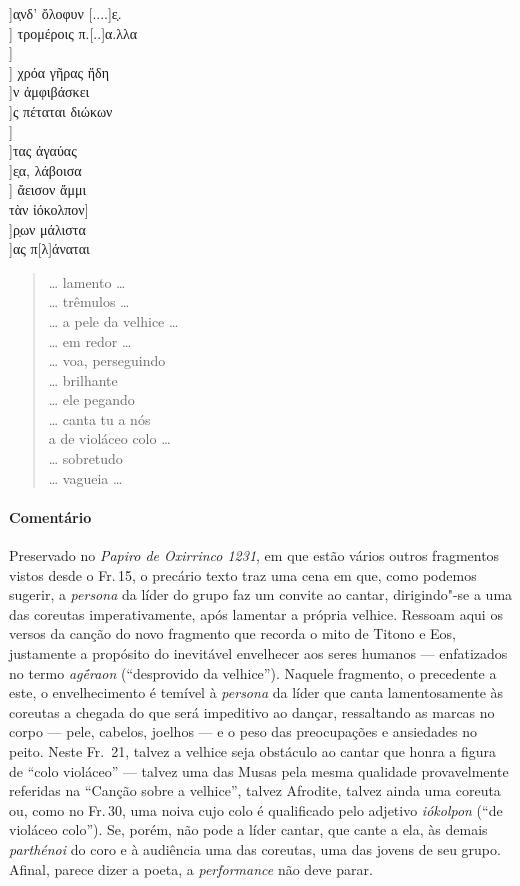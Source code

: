 {\begin{gkverse}
]α̣νδ’ ὄλοφυν [....]ε̣.\\
] τρομέροις π.[..]α.λλα\\
]\\
  ] χρόα γῆρας ἤδη\\
   ]ν ἀμφιβάσκει\\
     ]ς πέταται διώκων\\
     ]\\
     ]τας ἀγαύας\\
   ]ε̣α, λάβοισα\\
   ] ἄεισον ἄμμι\\
τὰν ἰόκολπον\qquad         ]\\
        ]ρ̣ων μάλιστα\\
         ]ας π[λ]άναται
\end{gkverse}


\begin{verse}
\ldots{} lamento \ldots{}\\
\ldots{} trêmulos \ldots{}\\
\ldots{} a pele da velhice \ldots{}\\
\ldots{} em redor \ldots{}\\
\ldots{} voa, perseguindo\\
\ldots{} brilhante\\
\ldots{} ele pegando\\
\ldots{} canta tu a nós\\
a de violáceo colo \ldots{}\\
\ldots{} sobretudo\\
\ldots{} vagueia \ldots{}
\end{verse}

{\paragraph{Comentário} Preservado no \emph{Papiro de Oxirrinco 1231}, em que estão vários
outros fragmentos vistos desde o Fr.\,15, o precário texto traz uma
cena em que, como podemos sugerir, a \emph{persona} da líder do grupo
faz um convite ao cantar, dirigindo"-se a uma das coreutas
imperativamente, após lamentar a própria velhice. Ressoam aqui os versos
da canção do novo fragmento que recorda o mito de Titono e Eos,
justamente a propósito do inevitável envelhecer aos seres humanos ---
enfatizados no termo \emph{agḗraon} (``desprovido da velhice'').
Naquele fragmento, o precedente a este, o envelhecimento é temível à \emph{persona} da líder que canta lamentosamente às
coreutas a chegada do que será impeditivo ao dançar, ressaltando as
marcas no corpo --- pele, cabelos, joelhos --- e o peso das
preocupações e ansiedades no peito. Neste Fr.~21, talvez a
velhice seja obstáculo ao cantar que honra a figura de ``colo violáceo''
--- talvez uma das Musas pela mesma qualidade provavelmente referidas na
``Canção sobre a velhice'', talvez Afrodite, talvez ainda uma coreuta
ou, como no Fr.\,30, uma noiva cujo colo é qualificado pelo adjetivo \textit{iókolpon} (``de violáceo colo''). Se, porém, não pode a líder cantar, que
cante a ela, às demais \emph{parthénoi} do coro e à audiência uma das
coreutas, uma das jovens de seu grupo. Afinal, parece dizer a poeta, a
\emph{performance} não deve parar.}



}
